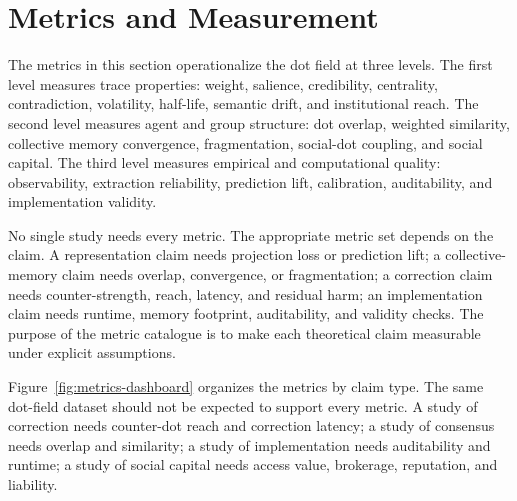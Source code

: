 \documentclass[11pt]{article}
\theoremstyle{remark}
\begin{document}
\section{Metrics and Measurement}\label{metrics-and-measurement}

The metrics in this section operationalize the dot field at three levels. The first level measures trace properties: weight, salience, credibility, centrality, contradiction, volatility, half-life, semantic drift, and institutional reach. The second level measures agent and group structure: dot overlap, weighted similarity, collective memory convergence, fragmentation, social-dot coupling, and social capital. The third level measures empirical and computational quality: observability, extraction reliability, prediction lift, calibration, auditability, and implementation validity.

No single study needs every metric. The appropriate metric set depends on the claim. A representation claim needs projection loss or prediction lift; a collective-memory claim needs overlap, convergence, or fragmentation; a correction claim needs counter-strength, reach, latency, and residual harm; an implementation claim needs runtime, memory footprint, auditability, and validity checks. The purpose of the metric catalogue is to make each theoretical claim measurable under explicit assumptions.


Figure~\ref{fig:metrics-dashboard} organizes the metrics by claim type. The same dot-field dataset should not be expected to support every metric. A study of correction needs counter-dot reach and correction latency; a study of consensus needs overlap and similarity; a study of implementation needs auditability and runtime; a study of social capital needs access value, brokerage, reputation, and liability.
\end{document}
